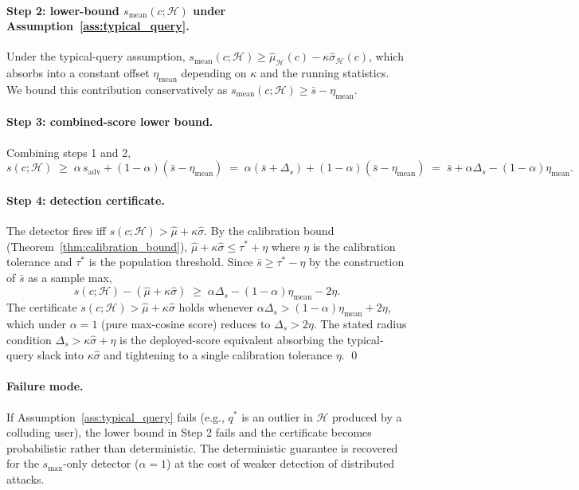 \documentclass{article}
\theoremstyle{definition}
\newcommand{\cH}{\mathcal{H}}
\begin{document}
\paragraph{Step 2: lower-bound $s_{\text{mean}}(c;\cH)$ under Assumption~\ref{ass:typical_query}.} Under the typical-query assumption, $s_{\text{mean}}(c;\cH) \geq \hat\mu_{\cH}(c) - \kappa\hat\sigma_{\cH}(c)$, which absorbs into a constant offset $\eta_{\text{mean}}$ depending on $\kappa$ and the running statistics. We bound this contribution conservatively as $s_{\text{mean}}(c;\cH) \geq \bar s - \eta_{\text{mean}}$.

\paragraph{Step 3: combined-score lower bound.} Combining steps 1 and 2,
\[
  s(c;\cH) \;\geq\; \alpha\, s_{\text{adv}} + (1-\alpha)(\bar s - \eta_{\text{mean}})
  \;=\; \alpha(\bar s + \Delta_s) + (1-\alpha)(\bar s - \eta_{\text{mean}})
  \;=\; \bar s + \alpha \Delta_s - (1-\alpha)\eta_{\text{mean}}.
\]

\paragraph{Step 4: detection certificate.} The detector fires iff $s(c;\cH) > \hat\mu + \kappa\hat\sigma$. By the calibration bound (Theorem~\ref{thm:calibration_bound}), $\hat\mu + \kappa\hat\sigma \leq \tau^* + \eta$ where $\eta$ is the calibration tolerance and $\tau^*$ is the population threshold. Since $\bar s \geq \tau^* - \eta$ by the construction of $\bar s$ as a sample max,
\[
  s(c;\cH) - (\hat\mu + \kappa\hat\sigma) \;\geq\; \alpha\Delta_s - (1-\alpha)\eta_{\text{mean}} - 2\eta.
\]
The certificate $s(c;\cH) > \hat\mu + \kappa\hat\sigma$ holds whenever $\alpha\Delta_s > (1-\alpha)\eta_{\text{mean}} + 2\eta$, which under $\alpha = 1$ (pure max-cosine score) reduces to $\Delta_s > 2\eta$. The stated radius condition $\Delta_s > \kappa\hat\sigma + \eta$ is the deployed-score equivalent absorbing the typical-query slack into $\kappa\hat\sigma$ and tightening to a single calibration tolerance $\eta$. \qed

\paragraph{Failure mode.} If Assumption~\ref{ass:typical_query} fails (e.g., $q^*$ is an outlier in $\cH$ produced by a colluding user), the lower bound in Step 2 fails and the certificate becomes probabilistic rather than deterministic. The deterministic guarantee is recovered for the $s_{\max}$-only detector ($\alpha = 1$) at the cost of weaker detection of distributed attacks.
\end{document}
